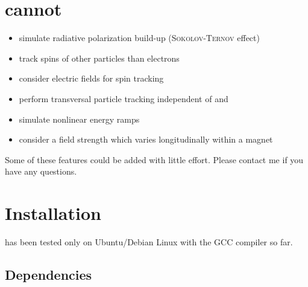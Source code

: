 \documentclass[a4paper]{scrartcl}
\begin{document}
\section{\polem cannot}
\label{sec:polem-cannot}

\begin{itemize}
\item simulate radiative polarization build-up (\textsc{Sokolov-Ternov} effect)
\item track spins of other particles than electrons
\item consider electric fields for spin tracking
\item perform transversal particle tracking independent of \ele and \madx
\item simulate nonlinear energy ramps
\item consider a field strength which varies longitudinally within a magnet
\end{itemize}
Some of these features could be added with little effort. Please contact me if you have
any questions.






\section{Installation}
\label{sec:installation}

\polem has been tested only on Ubuntu/Debian Linux with the GCC compiler so far.

\subsection{Dependencies}
\label{sec:dependencies}
\end{document}
